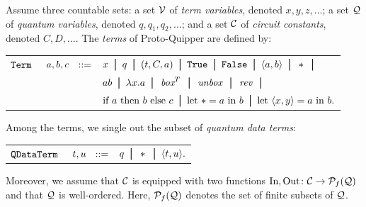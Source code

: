\documentclass[twoside]{article}
\begin{document}
\begin{definition}
  Assume three countable sets: a set $\mathcal{V}$ of \emph{term variables},
  denoted $x,y,z,\ldots$; a set $\mathcal{Q}$ of \emph{quantum variables},
  denoted $q,q_1,q_2,\ldots$; and a set $\mathcal{C}$ of \emph{circuit
    constants}, denoted $C,D,\ldots$. The \emph{terms} of
  Proto-Quipper are defined by:
\begin{center}
\begin{tabular}{rrl}
$\texttt{Term}$&$~a,b,c~~ ::=$ & $x \bor q \bor (t,C,a) \bor \true 
  \bor \false \bor \p{a,b} \bor * \bor$ \\[0.05in]
& & $ab \bor \lambda x.a \bor \boxx^T \bor \unbox \bor \rev 
    \bor $\\[0.05in]
& & $\ifthenelse{a}{b}{c} \bor \letin{*}{a}{b} \bor
    \letin{\p{x,y}}{a}{b}.$
\end{tabular}
\end{center}
Among the terms, we single out the subset of \emph{quantum data terms}:
\begin{center}
\begin{tabular}{rrl}
$\texttt{QDataTerm}$&$~t,u~~::=$ & $q \bor * \bor \p{t,u}.$
\end{tabular}
\end{center}
Moreover, we assume that $\mathcal{C}$ is equipped with two functions 
$\mathop{\textrm{In}}\nolimits,\mathop{\textrm{Out}}\nolimits\colon \mathcal{C}\to\mathcal{P}_f(\mathcal{Q})$ and that $\mathcal{Q}$ is 
well-ordered. Here, $\mathcal{P}_f(\mathcal{Q})$ denotes the set of finite subsets
of $\mathcal{Q}$.
\end{definition}
\end{document}
